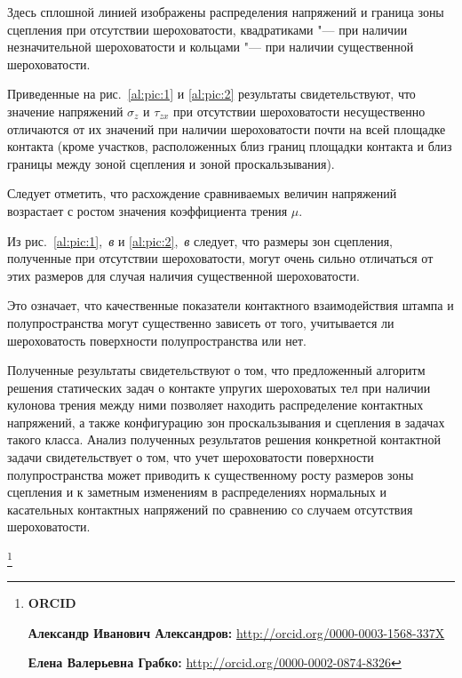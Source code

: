 Здесь сплошной линией изображены распределения напряжений и граница зоны сцепления при отсутствии шероховатости, квадратиками "--- при наличии незначительной шероховатости и кольцами "--- при наличии существенной шероховатости.



Приведенные на рис.~\ref{al:pic:1} и \ref{al:pic:2} результаты свидетельствуют, что значение напряжений $\sigma _{z} $ и $\tau _{zx} $ при отсутствии шероховатости несущественно отличаются от их значений при наличии шероховатости почти на всей площадке контакта (кроме участков, расположенных близ границ площадки контакта и близ границы между зоной сцепления и зоной проскальзывания). 

Следует отметить, что расхождение сравниваемых величин напряжений возрастает с ростом значения коэффициента трения $\mu $.



Из рис.~\ref{al:pic:1},~{\sl в} и \ref{al:pic:2},~{\sl в} следует, что размеры зон сцепления, полученные при отсутствии шероховатости, могут очень сильно отличаться от этих размеров для случая наличия существенной шероховатости. 

Это означает, что качественные показатели контактного взаимодействия штампа и полупространства могут существенно зависеть от того, учитывается ли шероховатость поверхности полупространства или нет.



\smallskip




Полученные результаты свидетельствуют о том, что предложенный алгоритм решения статических задач о контакте упругих шероховатых тел при наличии кулонова трения между ними позволяет находить распределение контактных напряжений, а также конфигурацию зон проскальзывания и сцепления в задачах такого класса. Анализ полученных результатов решения конкретной контактной задачи свидетельствует о том, что учет шероховатости поверхности полупространства может приводить к существенному росту размеров зоны сцепления и к заметным изменениям в распределениях нормальных и касательных контактных напряжений по сравнению со случаем отсутствия шероховатости.











\thanks{{\bf ORCID}



{\bf  Александр Иванович Александров:} \url{http://orcid.org/0000-0003-1568-337X}



{\bf Елена Валерьевна Грабко:} \url{http://orcid.org/0000-0002-0874-8326}

}



